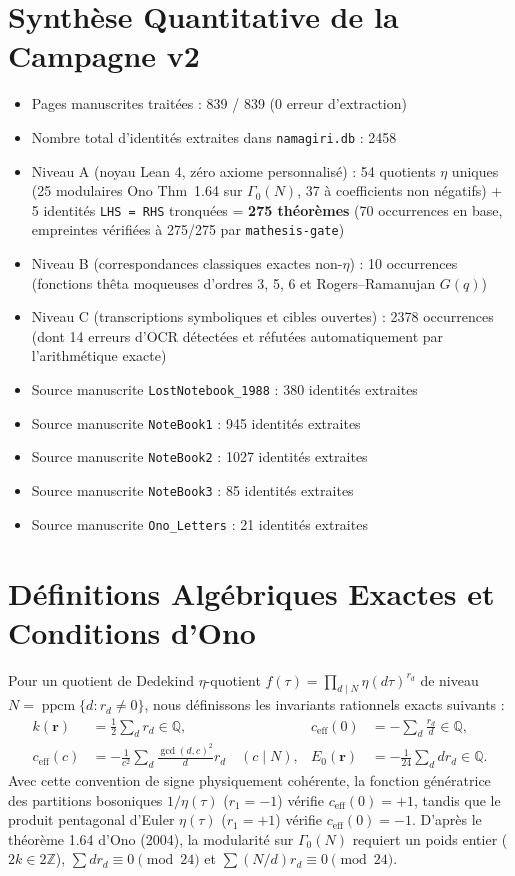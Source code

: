 \documentclass[11pt,twoside,openright]{book}
\begin{document}
\chapter{Synthèse Quantitative de la Campagne v2}
\begin{itemize}
  \item Pages manuscrites traitées : 839 / 839 (0 erreur d'extraction)
  \item Nombre total d'identités extraites dans \texttt{namagiri.db} : 2458
  \item Niveau A (noyau Lean 4, zéro axiome personnalisé) : 54 quotients $\eta$ uniques (25 modulaires Ono Thm~1.64 sur $\Gamma_0(N)$, 37 à coefficients non négatifs) + 5 identités \texttt{LHS = RHS} tronquées = \textbf{275 théorèmes} (70 occurrences en base, empreintes vérifiées à 275/275 par \texttt{mathesis-gate})
  \item Niveau B (correspondances classiques exactes non-$\eta$) : 10 occurrences (fonctions thêta moqueuses d'ordres 3, 5, 6 et Rogers--Ramanujan $G(q)$)
  \item Niveau C (transcriptions symboliques et cibles ouvertes) : 2378 occurrences (dont 14 erreurs d'OCR détectées et réfutées automatiquement par l'arithmétique exacte)
  \item Source manuscrite \texttt{LostNotebook\_1988} : 380 identités extraites
  \item Source manuscrite \texttt{NoteBook1} : 945 identités extraites
  \item Source manuscrite \texttt{NoteBook2} : 1027 identités extraites
  \item Source manuscrite \texttt{NoteBook3} : 85 identités extraites
  \item Source manuscrite \texttt{Ono\_Letters} : 21 identités extraites
\end{itemize}

\chapter{Définitions Algébriques Exactes et Conditions d'Ono}
Pour un quotient de Dedekind $\eta$-quotient $f(\tau) = \prod_{d \mid N} \eta(d\tau)^{r_d}$ de niveau $N = \operatorname{ppcm}\{d : r_d \neq 0\}$, nous définissons les invariants rationnels exacts suivants :
\begin{align*}
  k(\mathbf{r}) &= \frac{1}{2} \sum_d r_d \in \mathbb{Q}, &
  c_{\text{eff}}(0) &= -\sum_d \frac{r_d}{d} \in \mathbb{Q}, \\
  c_{\text{eff}}(c) &= -\frac{1}{c^2} \sum_d \frac{\gcd(d, c)^2}{d} r_d \quad (c \mid N), &
  E_0(\mathbf{r}) &= -\frac{1}{24} \sum_d d r_d \in \mathbb{Q}.
\end{align*}
Avec cette convention de signe physiquement cohérente, la fonction génératrice des partitions bosoniques $1/\eta(\tau)$ ($r_1 = -1$) vérifie $c_{\text{eff}}(0) = +1$, tandis que le produit pentagonal d'Euler $\eta(\tau)$ ($r_1 = +1$) vérifie $c_{\text{eff}}(0) = -1$. D'après le théorème 1.64 d'Ono (2004), la modularité sur $\Gamma_0(N)$ requiert un poids entier ($2k \in 2\mathbb{Z}$), $\sum d r_d \equiv 0 \pmod{24}$ et $\sum (N/d) r_d \equiv 0 \pmod{24}$.
\end{document}
